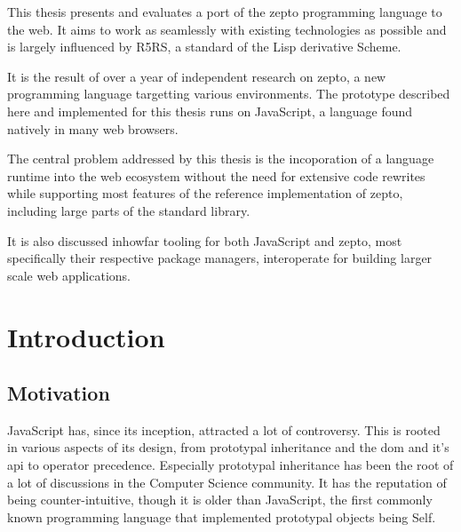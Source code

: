 \documentclass[oneside,11pt,xetex]{scrbook}
\begin{document}

This thesis presents and evaluates a port of the zepto programming language to the web. It aims to
work as seamlessly with existing technologies as possible and is largely influenced by R5RS,
a standard of the Lisp derivative Scheme.

It is the result of over a year of independent research on zepto, a new programming language
targetting various environments. The prototype described here and implemented for this
thesis runs on JavaScript, a language found natively in many web browsers.

The central problem addressed by this thesis is the incoporation of a language runtime
into the web ecosystem without the need for extensive code rewrites while supporting
most features of the reference implementation of zepto, including large parts of the
standard library.

It is also discussed inhowfar tooling for both JavaScript and zepto, most specifically
their respective package managers, interoperate for building larger scale web applications.

\tableofcontents

\printglossary[type=\acronymtype,title=Abbreviations]

\mainmatter

\pagestyle{headings}

\chapter{Introduction}
\label{chap:intro}

\section{Motivation}
\label{sec:Motivation}

JavaScript has, since its inception, attracted a lot of controversy. This is rooted
in various aspects of its design, from prototypal inheritance and the \gls{dom} and it's
\gls{api} to operator precedence. Especially prototypal inheritance  has been the root
of a lot of discussions in the Computer Science community. It has the reputation of
being counter-intuitive, though it is older than JavaScript, the first commonly known
programming language that implemented prototypal objects being Self.
\end{document}
